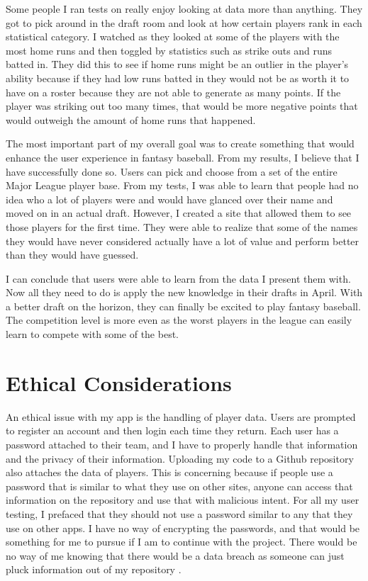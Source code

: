 \documentclass[10pt,twocolumn]{article}
\begin{document}
	Some people I ran tests on really enjoy looking at data more than anything. They got to pick around in the draft room and look at how certain players rank in each statistical category. I watched as they looked at some of the players with the most home runs and then toggled by statistics such as strike outs and runs batted in. They did this to see if home runs might be an outlier in the player's ability because if they had low runs batted in they would not be as worth it to have on a roster because they are not able to generate as many points. If the player was striking out too many times, that would be more negative points that would outweigh the amount of home runs that happened.
	
	The most important part of my overall goal was to create something that would enhance the user experience in fantasy baseball. From my results, I believe that I have successfully done so. Users can pick and choose from a set of the entire Major League player base. From my tests, I was able to learn that people had no idea who a lot of players were and would have glanced over their name and moved on in an actual draft. However, I created a site that allowed them to see those players for the first time. They were able to realize that some of the names they would have never considered actually have a lot of value and perform better than they would have guessed.
	
	I can conclude that users were able to learn from the data I present them with. Now all they need to do is apply the new knowledge in their drafts in April. With a better draft on the horizon, they can finally be excited to play fantasy baseball. The competition level is more even as the worst players in the league can easily learn to compete with some of the best.

\section{Ethical Considerations}
	An ethical issue with my app is the handling of player data. Users are prompted to register an account and then login each time they return. Each user has a password attached to their team, and I have to properly handle that information and the privacy of their information. Uploading my code to a Github repository also attaches the data of players. This is concerning because if people use a password that is similar to what they use on other sites, anyone can access that information on the repository and use that with malicious intent. For all my user testing, I prefaced that they should not use a password similar to any that they use on other apps. I have no way of encrypting the passwords, and that would be something for me to pursue if I am to continue with the project. There would be no way of me knowing that there would be a data breach as someone can just pluck information out of my repository \cite{Tupaz}.
	
\end{document}

